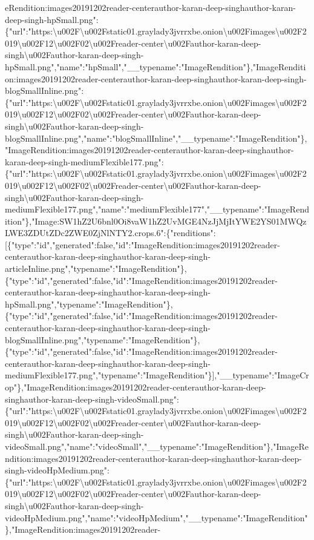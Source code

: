 eRendition:images20191202reader-centerauthor-karan-deep-singhauthor-karan-deep-singh-hpSmall.png":\{"url":"https:\textbackslash{}u002F\textbackslash{}u002Fstatic01.graylady3jvrrxbe.onion\textbackslash{}u002Fimages\textbackslash{}u002F2019\textbackslash{}u002F12\textbackslash{}u002F02\textbackslash{}u002Freader-center\textbackslash{}u002Fauthor-karan-deep-singh\textbackslash{}u002Fauthor-karan-deep-singh-hpSmall.png","name":"hpSmall","\_\_typename":"ImageRendition"\},"ImageRendition:images20191202reader-centerauthor-karan-deep-singhauthor-karan-deep-singh-blogSmallInline.png":\{"url":"https:\textbackslash{}u002F\textbackslash{}u002Fstatic01.graylady3jvrrxbe.onion\textbackslash{}u002Fimages\textbackslash{}u002F2019\textbackslash{}u002F12\textbackslash{}u002F02\textbackslash{}u002Freader-center\textbackslash{}u002Fauthor-karan-deep-singh\textbackslash{}u002Fauthor-karan-deep-singh-blogSmallInline.png","name":"blogSmallInline","\_\_typename":"ImageRendition"\},"ImageRendition:images20191202reader-centerauthor-karan-deep-singhauthor-karan-deep-singh-mediumFlexible177.png":\{"url":"https:\textbackslash{}u002F\textbackslash{}u002Fstatic01.graylady3jvrrxbe.onion\textbackslash{}u002Fimages\textbackslash{}u002F2019\textbackslash{}u002F12\textbackslash{}u002F02\textbackslash{}u002Freader-center\textbackslash{}u002Fauthor-karan-deep-singh\textbackslash{}u002Fauthor-karan-deep-singh-mediumFlexible177.png","name":"mediumFlexible177","\_\_typename":"ImageRendition"\},"Image:SW1hZ2U6bnl0Oi8vaW1hZ2UvMGE4NzJjMjItYWE2YS01MWQzLWE3ZDUtZDc2ZWE0ZjNlNTY2.crops.6":\{"renditions":{[}\{"type":"id","generated":false,"id":"ImageRendition:images20191202reader-centerauthor-karan-deep-singhauthor-karan-deep-singh-articleInline.png","typename":"ImageRendition"\},\{"type":"id","generated":false,"id":"ImageRendition:images20191202reader-centerauthor-karan-deep-singhauthor-karan-deep-singh-hpSmall.png","typename":"ImageRendition"\},\{"type":"id","generated":false,"id":"ImageRendition:images20191202reader-centerauthor-karan-deep-singhauthor-karan-deep-singh-blogSmallInline.png","typename":"ImageRendition"\},\{"type":"id","generated":false,"id":"ImageRendition:images20191202reader-centerauthor-karan-deep-singhauthor-karan-deep-singh-mediumFlexible177.png","typename":"ImageRendition"\}{]},"\_\_typename":"ImageCrop"\},"ImageRendition:images20191202reader-centerauthor-karan-deep-singhauthor-karan-deep-singh-videoSmall.png":\{"url":"https:\textbackslash{}u002F\textbackslash{}u002Fstatic01.graylady3jvrrxbe.onion\textbackslash{}u002Fimages\textbackslash{}u002F2019\textbackslash{}u002F12\textbackslash{}u002F02\textbackslash{}u002Freader-center\textbackslash{}u002Fauthor-karan-deep-singh\textbackslash{}u002Fauthor-karan-deep-singh-videoSmall.png","name":"videoSmall","\_\_typename":"ImageRendition"\},"ImageRendition:images20191202reader-centerauthor-karan-deep-singhauthor-karan-deep-singh-videoHpMedium.png":\{"url":"https:\textbackslash{}u002F\textbackslash{}u002Fstatic01.graylady3jvrrxbe.onion\textbackslash{}u002Fimages\textbackslash{}u002F2019\textbackslash{}u002F12\textbackslash{}u002F02\textbackslash{}u002Freader-center\textbackslash{}u002Fauthor-karan-deep-singh\textbackslash{}u002Fauthor-karan-deep-singh-videoHpMedium.png","name":"videoHpMedium","\_\_typename":"ImageRendition"\},"ImageRendition:images20191202reader-